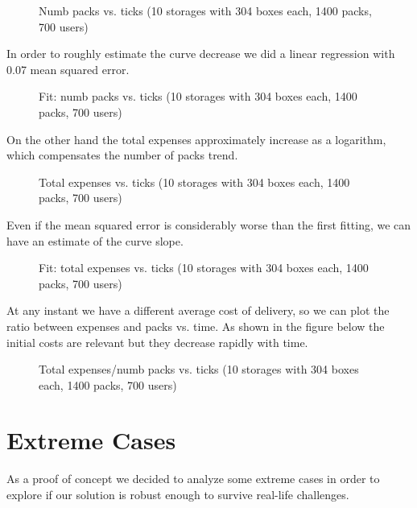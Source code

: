 \documentclass[11pt,a4paper]{article}
\begin{document}
\begin{figure}[h!]
\centering
\caption{Numb packs vs. ticks (10 storages with 304 boxes each, 1400 packs, 700 users)}
\end{figure}

In order to roughly estimate the curve decrease we did a linear regression with 0.07 mean squared error.

\begin{figure}[h!]
\centering
\caption{Fit: numb packs vs. ticks (10 storages with 304 boxes each, 1400 packs, 700 users)}
\end{figure}

\newpage
On the other hand the total expenses approximately increase as a logarithm, which compensates the number of packs trend.

\begin{figure}[h!]
\centering
\caption{Total expenses vs. ticks (10 storages with 304 boxes each, 1400 packs, 700 users)}
\end{figure}

Even if the mean squared error is considerably worse than the first fitting, we can have an estimate of the curve slope.

\begin{figure}[h!]
\centering
\caption{Fit: total expenses vs. ticks (10 storages with 304 boxes each, 1400 packs, 700 users)}
\end{figure}

\newpage
At any instant we have a different average cost of delivery, so we can plot the ratio between expenses and packs vs. time. As shown in the figure below the initial costs are relevant but they decrease rapidly with time.

\begin{figure}[h!]
\centering
\caption{Total expenses/numb packs vs. ticks (10 storages with 304 boxes each, 1400 packs, 700 users)}
\end{figure}
 
\newpage
\section{Extreme Cases}
As a proof of concept we decided to analyze some extreme cases in order to explore if our solution is robust enough to survive real-life challenges.
\end{document}
